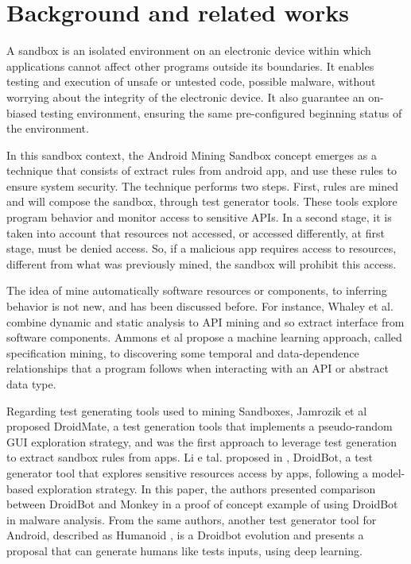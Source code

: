 \section{Background and related works}

A sandbox is an isolated environment on an electronic device within which applications cannot affect other programs outside its boundaries. It enables testing and execution of unsafe or untested code, possible malware, without worrying about the integrity of the electronic device. It also guarantee an on-biased testing environment, ensuring the same pre-configured beginning status of the environment.

In this sandbox context, the Android Mining Sandbox concept emerges as a technique that consists of extract rules from android app, and use these rules to ensure system security. The technique performs two steps. First, rules are mined and will compose the sandbox, through test generator tools. These tools explore program behavior and monitor access to sensitive APIs. In a second stage, it is taken into account that resources not accessed, or accessed differently, at first stage, must be denied access. So, if a malicious app requires access to resources, different from what was previously mined, the sandbox will prohibit this access.

The idea of mine automatically software resources or components, to inferring behavior is not new, and has been discussed before. For instance, Whaley et al. \cite{whaley2002automatic} combine dynamic and static analysis to API mining and so extract interface from software components. Ammons et al \cite{ammons2002mining} propose a machine learning
approach, called specification mining, to discovering some temporal and data-dependence relationships that a program follows when interacting with an API or abstract data type.

Regarding test generating tools used to mining Sandboxes, Jamrozik et al \cite{jamrozik2016droidmate} proposed DroidMate, a test generation tools that implements a pseudo-random GUI exploration strategy, and was the first approach to leverage test generation to extract sandbox rules from apps. Li e tal. proposed in \cite{li2017droidbot}, DroidBot, a test generator tool that explores sensitive resources access by apps, following a model-based exploration strategy. In this paper, the authors presented comparison between DroidBot and Monkey \cite{Monkey} in a proof of concept example of using DroidBot in malware analysis. From the same authors, another test generator tool for Android, described as Humanoid \cite{humanoid-paper}, is a Droidbot evolution and presents a proposal that can generate humans like tests inputs, using deep learning.

